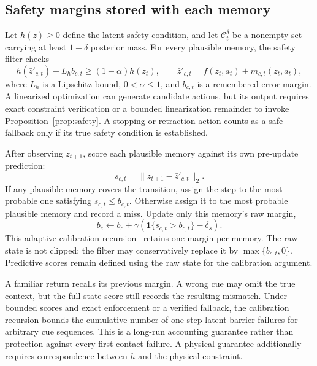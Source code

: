 \subsection{Safety margins stored with each memory}\label{sec:safetymethod}
Let $h(z)\geq0$ define the latent safety condition, and let $\mathcal C_t^\delta$ be a nonempty set carrying at least $1-\delta$ posterior mass. For every plausible memory, the safety filter checks
\begin{equation}\label{eq:safety}
 h(\bar z'_{c,t})-L_h b_{c,t}\geq(1-\alpha)h(z_t),
 \qquad \bar z'_{c,t}=f(z_t,a_t)+m_{c,t}(z_t,a_t),
\end{equation}
where $L_h$ is a Lipschitz bound, $0<\alpha\leq1$, and $b_{c,t}$ is a remembered error margin. A linearized optimization can generate candidate actions, but its output requires exact constraint verification or a bounded linearization remainder to invoke Proposition~\ref{prop:safety}. A stopping or retraction action counts as a safe fallback only if its true safety condition is established.

After observing $z_{t+1}$, score each plausible memory against its own pre-update prediction:
\begin{equation}\label{eq:safetyscore}
 s_{c,t}=\|z_{t+1}-\bar z'_{c,t}\|_2.
\end{equation}
If any plausible memory covers the transition, assign the step to the most probable one satisfying $s_{c,t}\leq b_{c,t}$. Otherwise assign it to the most probable plausible memory and record a miss. Update only this memory's raw margin,
\begin{equation}\label{eq:marginupdate}
 b_c\leftarrow b_c+\gamma\left(\mathbf1\{s_{c,t}>b_{c,t}\}-\delta_s\right).
\end{equation}
This adaptive calibration recursion~\cite{gibbs2021adaptive} retains one margin per memory. The raw state is not clipped; the filter may conservatively replace it by $\max\{b_{c,t},0\}$. Predictive scores remain defined using the raw state for the calibration argument.

A familiar return recalls its previous margin. A wrong cue may omit the true context, but the full-state score still records the resulting mismatch. Under bounded scores and exact enforcement or a verified fallback, the calibration recursion bounds the cumulative number of one-step latent barrier failures for arbitrary cue sequences. This is a long-run accounting guarantee rather than protection against every first-contact failure. A physical guarantee additionally requires correspondence between $h$ and the physical constraint.

